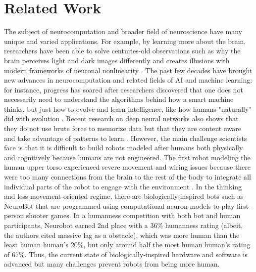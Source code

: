 \documentclass{sigchi}
\begin{document}
\section{Related Work}
The subject of neurocomputation and broader field of neuroscience have many unique and varied applications. For example, by learning more about the brain, researchers have been able to solve centuries-old observations such as why the brain perceives light and dark images differently and creates illusions with modern frameworks of neuronal nonlinearity \cite{nonlinearvisual}. The past few decades have brought new advances in neurocomputation and related fields of AI and machine learning: for instance, progress has soared after researchers discovered that one does not necessarily need to understand the algorithms behind how a smart machine thinks, but just how to evolve and learn intelligence, like how humans "naturally" did with evolution \cite{poglevels}. Recent research on deep neural networks also shows that they do not use brute force to memorize data but that they are content aware and take advantage of patterns to learn \cite{memorizationdeep}. However, the main challenge scientists face is that it is difficult to build robots modeled after humans both physically and cognitively because humans are not engineered. The first robot modeling the human upper torso experienced severe movement and wiring issues because there were too many connections from the brain to the rest of the body to integrate all individual parts of the robot to engage with the environment \cite{bodybot}. In the thinking and less movement-oriented regime, there are biologically-inspired bots such as NeuroBot \cite{neurobot} that are programmed using computational neuron models to play first-person shooter games. In a humanness competition with both bot and human participants, Neurobot earned 2nd place with a 36\% humanness rating (albeit, the authors cited massive lag as a obstacle), which was more human than the least human human's 20\%, but only around half the most human human's rating of 67\%. Thus, the current state of biologically-inspired hardware and software is advanced but many challenges prevent robots from being more human.
\end{document}
